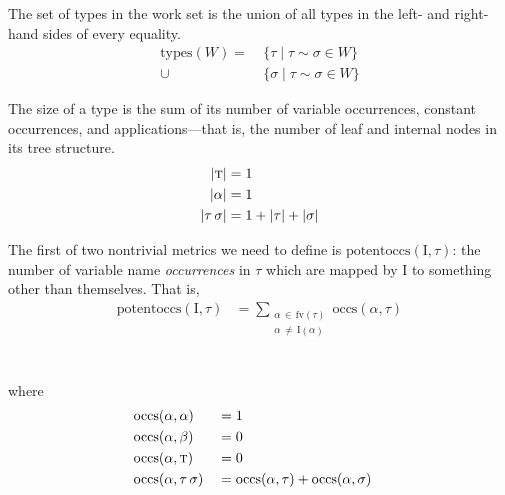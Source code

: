 \documentclass[10pt, letterpaper, oneside]{article}
\newcommand{\inertset}{\text{I}}
\newcommand{\fv}{\mathrm{fv}}
\begin{document}
The set of types in the work set is the union of all types in the left- and right-hand sides of every equality.
\begin{align*}
  \text{types}(W) =    &~\{\tau \mid \tau \sim \sigma \in W \}\\
                  \cup &~\{\sigma \mid \tau \sim \sigma \in W \}
\end{align*}

The size of a type is the sum of its number of variable occurrences, constant occurrences, and applications---that is, the number of leaf and internal nodes in its tree structure.
\begin{align*}
  |\text{\sc t}| &= 1\\
  |\alpha|       &= 1\\
  |\tau\,\sigma| &= 1 + |\tau| + |\sigma|
\end{align*}

The first of two nontrivial metrics we need to define is \(\text{potentoccs}(\inertset, \tau)\): the number of variable name \emph{occurrences} in \(\tau\) which are mapped by \(\inertset\) to something other than themselves. That is,
\begin{align*}
  \text{potentoccs}(\inertset, \tau) &= \!\!\!\!\sum_{\substack{\alpha\,\in\,\fv(\tau)\\\alpha\,\ne\,\inertset(\alpha)}}\!\!\!\text{occs}(\alpha, \tau)
\end{align*}\\\vspace{-2\baselineskip}\\
where\vspace{-.5\baselineskip}
\begin{alignat*}{3}
  &\text{occs}(\alpha, \alpha) &&= 1 &&\\
  &\text{occs}(\alpha, \beta)  &&= 0 &&\\
  &\text{occs}(\alpha, \text{\sc t}) &&= 0 &&\\
  &\text{occs}(\alpha, \tau\,\sigma) &&= \text{occs}(\alpha, \tau) + \text{occs}(\alpha, \sigma) &&
\end{alignat*}
\end{document}

